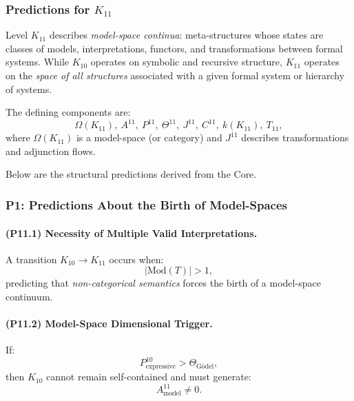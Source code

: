 

\subsubsection{Predictions for $K_{11}$}
\label{sec:predictions-k11}

Level $K_{11}$ describes \emph{model-space continua}:
meta-structures whose states are classes of models,
interpretations, functors, and transformations between
formal systems.
While $K_{10}$ operates on symbolic and recursive structure,
$K_{11}$ operates on the \emph{space of all structures}
associated with a given formal system or hierarchy of systems.

The defining components are:
\[
\Omega(K_{11}),\
A^{11},\
P^{11},\
\Theta^{11},\
J^{11},\
C^{11},\
k(K_{11}),\
T_{11},
\]
where $\Omega(K_{11})$ is a model-space (or category) and
$J^{11}$ describes transformations and adjunction flows.

Below are the structural predictions derived from the Core.

\subsubsection{P1: Predictions About the Birth of Model-Spaces}

\paragraph{(P11.1) Necessity of Multiple Valid Interpretations.}
A transition $K_{10} \to K_{11}$ occurs when:
\[
|\mathrm{Mod}(T)| > 1,
\]
predicting that \emph{non-categorical semantics} forces
the birth of a model-space continuum.

\paragraph{(P11.2) Model-Space Dimensional Trigger.}
If:
\[
P_{\mathrm{expressive}}^{10} > \Theta_{\mathrm{Gödel}},
\]
then $K_{10}$ cannot remain self-contained and must generate:
\[
A_{\mathrm{model}}^{11} \neq 0.
\]

